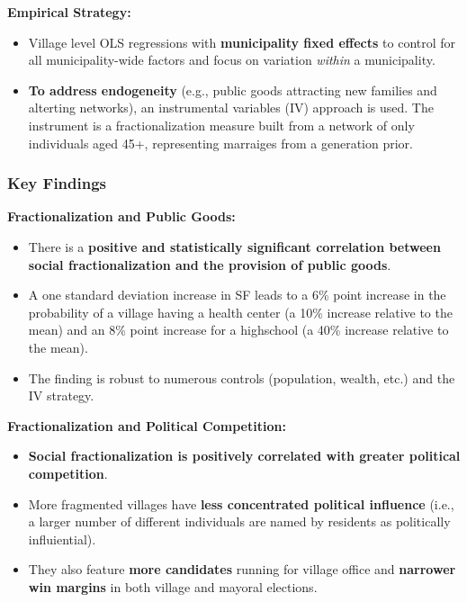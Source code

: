 \documentclass{article}
\begin{document}
    \noindent \textbf{Empirical Strategy:}
    \begin{itemize}
        \item Village level OLS regressions with
        \textbf{municipality fixed effects} to control for all
        municipality-wide factors and focus on variation \textit{within} a
        municipality.
        \item
        \textbf{To address endogeneity} (e.g., public goods attracting new families and alterting networks), an instrumental variables (IV) approach is used. The instrument is a fractionalization measure built from a network of only individuals aged 45+, representing marraiges from a generation prior.
    \end{itemize}

    \subsubsection{Key Findings}

    \noindent \textbf{Fractionalization and Public Goods:}
    \begin{itemize}
        \item There is a
        \textbf{positive and statistically significant correlation between social fractionalization and the provision of public goods}.
        \item A one standard deviation increase in SF leads to a 6\% point
        increase in the probability of a village having a health center (a 10\% increase relative to the mean) and an 8\% point increase for a highschool (a 40\% increase relative to the mean).
        \item The finding is robust to numerous controls (population,
        wealth, etc.) and the IV strategy.
    \end{itemize}

    \noindent \textbf{Fractionalization and Political Competition:}
    \begin{itemize}
        \item
        \textbf{Social fractionalization is positively correlated with greater political competition}.
        \item More fragmented villages have
        \textbf{less concentrated political influence} (i.e., a larger number of different individuals are named by residents as politically influiential).
        \item They also feature \textbf{more candidates} running for village
        office and \textbf{narrower win margins} in both village and mayoral
        elections.
    \end{itemize}
\end{document}
